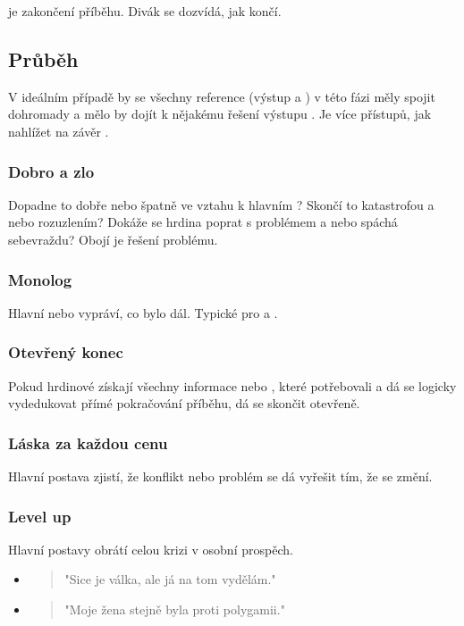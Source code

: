 \documentclass[main.tex]{subfiles}
\begin{document}
 je zakončení příběhu. Divák se dozvídá, jak  končí. 
 
\subsection{ Průběh }  
V ideálním případě by se všechny  reference (výstup  a ) v této fázi měly spojit dohromady a mělo by dojít k nějakému řešení výstupu . Je více přístupů, jak nahlížet na závěr . 
 
\subsubsection{ Dobro a zlo } Dopadne to dobře nebo špatně ve vztahu k hlavním ? Skončí to katastrofou a nebo rozuzlením? Dokáže se hrdina poprat s problémem a nebo spáchá sebevraždu? Obojí je řešení problému. 
 
\subsubsection{ Monolog } Hlavní  nebo  vypráví, co bylo dál. Typické pro  a . 
 
\subsubsection{ Otevřený konec } Pokud hrdinové získají všechny informace nebo , které potřebovali a dá se logicky vydedukovat přímé pokračování příběhu, dá se skončit otevřeně. 
 
\subsubsection{ Láska za každou cenu } Hlavní postava zjistí, že konflikt nebo problém se dá vyřešit tím, že se změní. 
 
\subsubsection{ Level up } Hlavní postavy obrátí celou krizi v osobní prospěch. 
 
\begin{itemize}
\item  \begin{quote}"Sice je válka, ale já na tom vydělám."\end{quote}
\item  \begin{quote}"Moje žena stejně byla proti polygamii."\end{quote}
\end{itemize}
 
\end{document}
